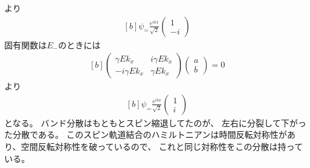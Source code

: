 \documentclass[../ap_2014.tex]{subfiles}
\begin{document}
より
\begin{equation}\begin{aligned}[b]
    \psi_ = \frac{e^{ikx}}{\sqrt{2}}\begin{pmatrix}
        1 \\ -i
    \end{pmatrix}
\end{aligned}\end{equation}
固有関数は\(E_-\)のときには
\begin{equation}\begin{aligned}[b]
    \begin{pmatrix}
        \gamma Ek_x & i\gamma Ek_x\\
        -i\gamma Ek_x & \gamma Ek_x
    \end{pmatrix}\begin{pmatrix}
        a \\ b
    \end{pmatrix}=0
\end{aligned}\end{equation}
より
\begin{equation}\begin{aligned}[b]
    \psi_ = \frac{e^{ikx}}{\sqrt{2}}\begin{pmatrix}
        1 \\ i
    \end{pmatrix}
\end{aligned}\end{equation}
となる。
バンド分散はもともとスピン縮退してたのが、
左右に分裂して下がった分散である。
このスピン軌道結合のハミルトニアンは時間反転対称性があり、空間反転対称性を破っているので、
これと同じ対称性をこの分散は持っている。
\begin{figure}[h]
    \centering
\end{figure}
\end{document}
